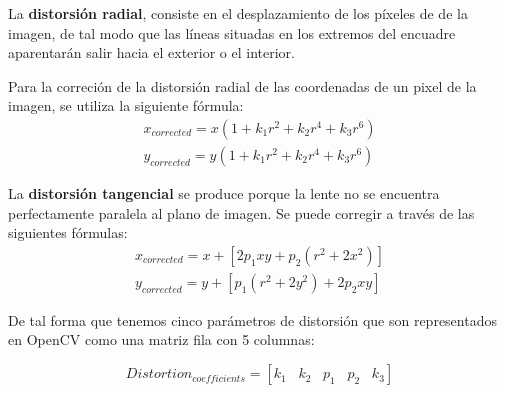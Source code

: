 La \textbf{distorsión radial}, consiste en el desplazamiento de los píxeles de de la imagen, de tal modo que las líneas situadas en los extremos del encuadre aparentarán salir hacia el exterior o el interior.   

Para la correción de la distorsión radial de las coordenadas de un pixel de la imagen, se utiliza la siguiente fórmula:
\begin{equation}
  \begin{split}
    x_{corrected} = x(1 + k_1 r^2 + k_2 r^4 + k_3 r^6)  \\
    y_{corrected} = y(1 + k_1 r^2 + k_2 r^4 + k_3 r^6)
  \end{split}
\end{equation}

La \textbf{distorsión tangencial} se produce porque la lente no se encuentra perfectamente paralela al plano de imagen. Se puede corregir a través de las siguientes fórmulas:
\begin{equation}
  \begin{split}
    x_{corrected} = x + [ 2p_1xy + p_2(r^2+2x^2)] \\ 
    y_{corrected} = y + [ p_1(r^2+ 2y^2)+ 2p_2xy]
  \end{split}
\end{equation}

De tal forma que tenemos cinco parámetros de distorsión que son representados en OpenCV como una matriz fila con 5 columnas: 

\begin{equation}
  Distortion_{coefficients} = [k_1 \hspace{10pt} k_2 \hspace{10pt} p_1 \hspace{10pt} p_2 \hspace{10pt} k_3]
\end{equation}


